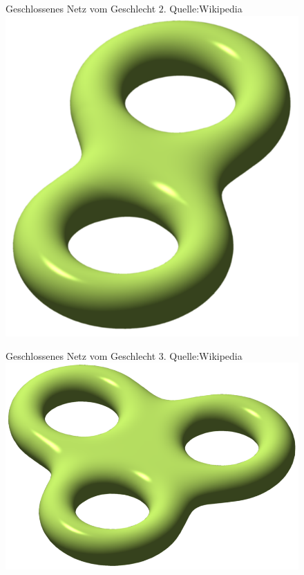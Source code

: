 \documentclass[]{article}
\begin{document}
\begin{figure}[H]
\centering
Geschlossenes Netz vom Geschlecht $2$. Quelle:Wikipedia \\
\includegraphics[scale=1.0]{Double_torus.png}
\end{figure}

\begin{figure}[H]
\centering
Geschlossenes Netz vom Geschlecht $3$. Quelle:Wikipedia \\
\includegraphics[scale=1.0]{Triple_torus.png}
\end{figure}
\end{document}
